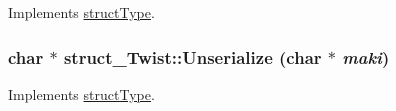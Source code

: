Implements \hyperlink{classstructType_ac89681a3336b2fc76e65435238241db2}{structType}.

\hypertarget{classstruct__Twist_a0531691876c9cbabb1932cb54592c956}{
\subsubsection[{Unserialize}]{\setlength{\rightskip}{0pt plus 5cm}char $\ast$ struct\_\-Twist::Unserialize (char $\ast$ {\em maki})}}
\label{classstruct__Twist_a0531691876c9cbabb1932cb54592c956}


Implements \hyperlink{classstructType_ac89681a3336b2fc76e65435238241db2}{structType}.



